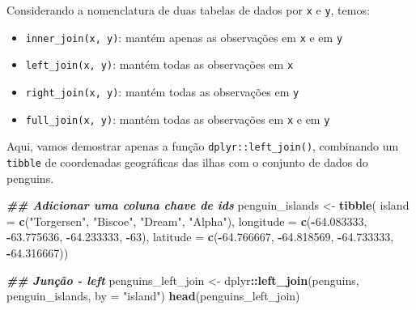 \documentclass[
]{article}
\newenvironment{Shaded}{\begin{snugshade}}{\end{snugshade}}
\newcommand{\AttributeTok}[1]{\textcolor[rgb]{0.13,0.29,0.53}{#1}}
\newcommand{\DecValTok}[1]{\textcolor[rgb]{0.00,0.00,0.81}{#1}}
\newcommand{\DocumentationTok}[1]{\textcolor[rgb]{0.56,0.35,0.01}{\textbf{\textit{#1}}}}
\newcommand{\FloatTok}[1]{\textcolor[rgb]{0.00,0.00,0.81}{#1}}
\newcommand{\FunctionTok}[1]{\textcolor[rgb]{0.13,0.29,0.53}{\textbf{#1}}}
\newcommand{\NormalTok}[1]{#1}
\newcommand{\OtherTok}[1]{\textcolor[rgb]{0.56,0.35,0.01}{#1}}
\newcommand{\SpecialCharTok}[1]{\textcolor[rgb]{0.81,0.36,0.00}{\textbf{#1}}}
\newcommand{\StringTok}[1]{\textcolor[rgb]{0.31,0.60,0.02}{#1}}
\providecommand{\tightlist}{%
  \setlength{\itemsep}{0pt}\setlength{\parskip}{0pt}}
\begin{document}
Considerando a nomenclatura de duas tabelas de dados por \texttt{x} e \texttt{y}, temos:

\begin{itemize}
\tightlist
\item
  \texttt{inner\_join(x,\ y)}: mantém apenas as observações em \texttt{x} e em \texttt{y}
\item
  \texttt{left\_join(x,\ y)}: mantém todas as observações em \texttt{x}
\item
  \texttt{right\_join(x,\ y)}: mantém todas as observações em \texttt{y}
\item
  \texttt{full\_join(x,\ y)}: mantém todas as observações em \texttt{x} e em \texttt{y}
\end{itemize}

Aqui, vamos demostrar apenas a função \texttt{dplyr::left\_join()}, combinando um \texttt{tibble} de coordenadas geográficas das ilhas com o conjunto de dados do penguins.

\begin{Shaded}
\begin{Highlighting}[]
\DocumentationTok{\#\# Adicionar uma coluna chave de ids}
\NormalTok{penguin\_islands }\OtherTok{\textless{}{-}} \FunctionTok{tibble}\NormalTok{(}
    \AttributeTok{island =} \FunctionTok{c}\NormalTok{(}\StringTok{"Torgersen"}\NormalTok{, }\StringTok{"Biscoe"}\NormalTok{, }\StringTok{"Dream"}\NormalTok{, }\StringTok{"Alpha"}\NormalTok{),}
    \AttributeTok{longitude =} \FunctionTok{c}\NormalTok{(}\SpecialCharTok{{-}}\FloatTok{64.083333}\NormalTok{, }\SpecialCharTok{{-}}\FloatTok{63.775636}\NormalTok{, }\SpecialCharTok{{-}}\FloatTok{64.233333}\NormalTok{, }\SpecialCharTok{{-}}\DecValTok{63}\NormalTok{),}
    \AttributeTok{latitude =} \FunctionTok{c}\NormalTok{(}\SpecialCharTok{{-}}\FloatTok{64.766667}\NormalTok{, }\SpecialCharTok{{-}}\FloatTok{64.818569}\NormalTok{, }\SpecialCharTok{{-}}\FloatTok{64.733333}\NormalTok{, }\SpecialCharTok{{-}}\FloatTok{64.316667}\NormalTok{))}

\DocumentationTok{\#\# Junção {-} left}
\NormalTok{penguins\_left\_join }\OtherTok{\textless{}{-}}\NormalTok{ dplyr}\SpecialCharTok{::}\FunctionTok{left\_join}\NormalTok{(penguins, penguin\_islands, }\AttributeTok{by =} \StringTok{"island"}\NormalTok{)}
\FunctionTok{head}\NormalTok{(penguins\_left\_join)}
\end{Highlighting}
\end{Shaded}
\end{document}
